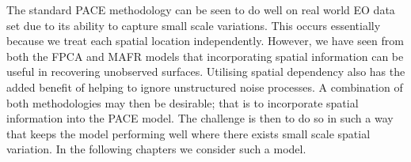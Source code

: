 The standard PACE methodology can be seen to do well on real world EO data set due to its ability to capture small scale variations.
This occurs essentially because we treat each spatial location independently.
However, we have seen from both the FPCA and MAFR models that incorporating spatial information can be useful in recovering unobserved surfaces.
Utilising spatial dependency also has the added benefit of helping to ignore unstructured noise processes. 
A combination of both methodologies may then be desirable; that is to incorporate spatial information into the PACE model.
The challenge is then to do so in such a way that keeps the model performing well where there exists small scale spatial variation.
In the following chapters we consider such a model. 